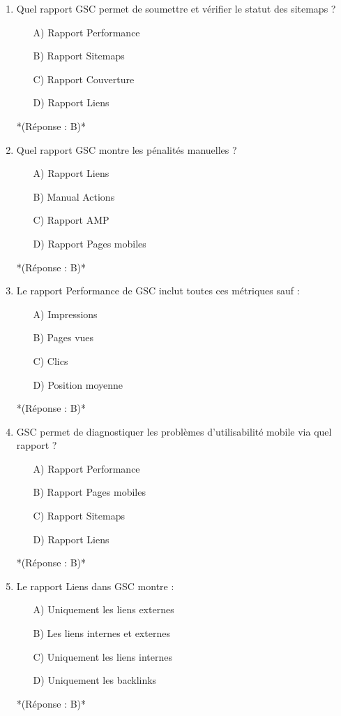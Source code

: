 \documentclass[12pt,a4paper,twoside]{report}
\begin{document}
\begin{enumerate}
    \item Quel rapport GSC permet de soumettre et vérifier le statut des sitemaps ?
    \begin{itemize}
        \item[A)] Rapport Performance
        \item[B)] Rapport Sitemaps
        \item[C)] Rapport Couverture
        \item[D)] Rapport Liens
    \end{itemize}
    *(Réponse : B)*

    \item Quel rapport GSC montre les pénalités manuelles ?
    \begin{itemize}
        \item[A)] Rapport Liens
        \item[B)] Manual Actions
        \item[C)] Rapport AMP
        \item[D)] Rapport Pages mobiles
    \end{itemize}
    *(Réponse : B)*

    \item Le rapport Performance de GSC inclut toutes ces métriques sauf :
    \begin{itemize}
        \item[A)] Impressions
        \item[B)] Pages vues
        \item[C)] Clics
        \item[D)] Position moyenne
    \end{itemize}
    *(Réponse : B)*

    \item GSC permet de diagnostiquer les problèmes d'utilisabilité mobile via quel rapport ?
    \begin{itemize}
        \item[A)] Rapport Performance
        \item[B)] Rapport Pages mobiles
        \item[C)] Rapport Sitemaps
        \item[D)] Rapport Liens
    \end{itemize}
    *(Réponse : B)*

    \item Le rapport Liens dans GSC montre :
    \begin{itemize}
        \item[A)] Uniquement les liens externes
        \item[B)] Les liens internes et externes
        \item[C)] Uniquement les liens internes
        \item[D)] Uniquement les backlinks
    \end{itemize}
    *(Réponse : B)*


\end{enumerate}
\end{document}
